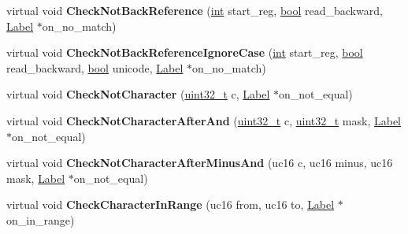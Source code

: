 \begin{DoxyCompactItemize}
\mbox{\label{classv8_1_1internal_1_1RegExpMacroAssemblerIA32_a035dcb51eb1182c16a408b0c29f53cff}} 
virtual void {\bfseries Check\+Not\+Back\+Reference} (\mbox{\hyperlink{classint}{int}} start\+\_\+reg, \mbox{\hyperlink{classbool}{bool}} read\+\_\+backward, \mbox{\hyperlink{classv8_1_1internal_1_1Label}{Label}} $\ast$on\+\_\+no\+\_\+match)
\item 
\mbox{\label{classv8_1_1internal_1_1RegExpMacroAssemblerIA32_abf787bfa749bc155e6c00ceae04103dd}} 
virtual void {\bfseries Check\+Not\+Back\+Reference\+Ignore\+Case} (\mbox{\hyperlink{classint}{int}} start\+\_\+reg, \mbox{\hyperlink{classbool}{bool}} read\+\_\+backward, \mbox{\hyperlink{classbool}{bool}} unicode, \mbox{\hyperlink{classv8_1_1internal_1_1Label}{Label}} $\ast$on\+\_\+no\+\_\+match)
\item 
\mbox{\label{classv8_1_1internal_1_1RegExpMacroAssemblerIA32_a166929a05dac7eae8623d87ea8f8a7a8}} 
virtual void {\bfseries Check\+Not\+Character} (\mbox{\hyperlink{classuint32__t}{uint32\+\_\+t}} c, \mbox{\hyperlink{classv8_1_1internal_1_1Label}{Label}} $\ast$on\+\_\+not\+\_\+equal)
\item 
\mbox{\label{classv8_1_1internal_1_1RegExpMacroAssemblerIA32_a67b8feb622ba65e52941ce3ece8c280f}} 
virtual void {\bfseries Check\+Not\+Character\+After\+And} (\mbox{\hyperlink{classuint32__t}{uint32\+\_\+t}} c, \mbox{\hyperlink{classuint32__t}{uint32\+\_\+t}} mask, \mbox{\hyperlink{classv8_1_1internal_1_1Label}{Label}} $\ast$on\+\_\+not\+\_\+equal)
\item 
\mbox{\label{classv8_1_1internal_1_1RegExpMacroAssemblerIA32_a40e51e9bad5b9af1abafcfe97fd936b5}} 
virtual void {\bfseries Check\+Not\+Character\+After\+Minus\+And} (uc16 c, uc16 minus, uc16 mask, \mbox{\hyperlink{classv8_1_1internal_1_1Label}{Label}} $\ast$on\+\_\+not\+\_\+equal)
\item 
\mbox{\label{classv8_1_1internal_1_1RegExpMacroAssemblerIA32_aa580bf36d047a145e1fb53452507c36a}} 
virtual void {\bfseries Check\+Character\+In\+Range} (uc16 from, uc16 to, \mbox{\hyperlink{classv8_1_1internal_1_1Label}{Label}} $\ast$on\+\_\+in\+\_\+range)

\end{DoxyCompactItemize}
